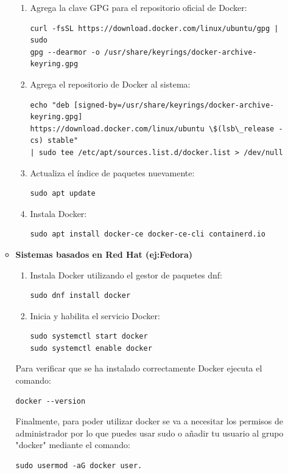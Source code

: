 \documentclass[paper=a4wide, fontsize=11pt]{report}	 %
\begin{document}
\begin{itemize}
\begin{itemize}
\begin{enumerate}
            \item Agrega la clave GPG para el repositorio oficial de Docker:
            \begin{lstlisting}[frame=single, basicstyle=\small]
curl -fsSL https://download.docker.com/linux/ubuntu/gpg | sudo 
gpg --dearmor -o /usr/share/keyrings/docker-archive-keyring.gpg
            \end{lstlisting}
            
            \item Agrega el repositorio de Docker al sistema:
            \begin{lstlisting}[frame=single, basicstyle=\tiny]
echo "deb [signed-by=/usr/share/keyrings/docker-archive-keyring.gpg]
https://download.docker.com/linux/ubuntu \$(lsb\_release -cs) stable"
| sudo tee /etc/apt/sources.list.d/docker.list > /dev/null
            \end{lstlisting}
            
            \item Actualiza el índice de paquetes nuevamente:
           \begin{lstlisting}[frame=single, basicstyle=\small]
sudo apt update
            \end{lstlisting}
            \item Instala Docker:
            \begin{lstlisting}[frame=single, basicstyle=\small]
sudo apt install docker-ce docker-ce-cli containerd.io
            \end{lstlisting}
        \end{enumerate}
        \item \textbf{Sistemas basados en Red Hat (ej:Fedora)}
        \begin{enumerate}
            \item Instala Docker utilizando el gestor de paquetes dnf:
            \begin{lstlisting}[frame=single, basicstyle=\small]
sudo dnf install docker
            \end{lstlisting}
            \item Inicia y habilita el servicio Docker:
            \begin{lstlisting}[frame=single, basicstyle=\small]
sudo systemctl start docker
sudo systemctl enable docker
            \end{lstlisting}
        \end{enumerate}
        Para verificar que se ha instalado correctamente Docker ejecuta el comando:
        \begin{lstlisting}[frame=single, basicstyle=\small]
docker --version
        \end{lstlisting}
             Finalmente, para poder utilizar docker se va a necesitar los permisos de administrador por lo que puedes usar sudo o añadir tu usuario al grupo "docker" mediante el comando:
              \begin{lstlisting}[frame=single, basicstyle=\small]
sudo usermod -aG docker user.
        \end{lstlisting}
    \end{itemize}
\end{itemize}
\end{document}

